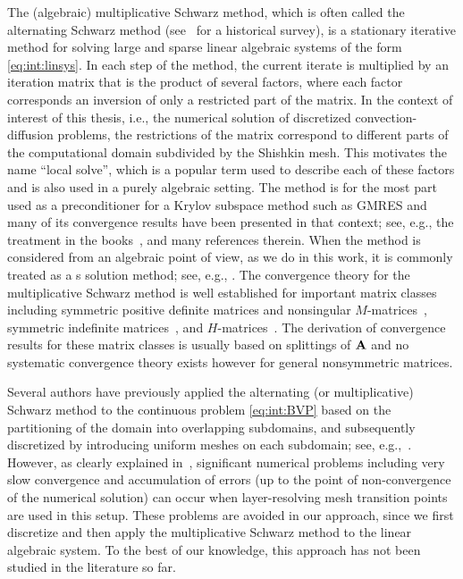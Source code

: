 \medskip

The (algebraic) multiplicative Schwarz method, which is often
called the alternating Schwarz method (see~\cite{Gan08} for a historical
survey), is a stationary iterative method for solving large
and sparse linear algebraic systems of the form \eqref{eq:int:linsys}. In each
step of the method, the current iterate is multiplied by
an iteration matrix that is the  product of several factors, where each factor
corresponds an inversion of only  a restricted part of the matrix. In the
context of interest of this thesis, i.e., the numerical solution of discretized
convection-diffusion problems, the restrictions of the matrix correspond to
different parts of the computational domain subdivided by the Shishkin
mesh. This motivates the name ``local solve'', which is a popular term used to
describe each of these factors and is also used in a purely algebraic setting.
The method is for the most part used as a preconditioner for a Krylov subspace
method such as GMRES and many of its convergence results have been presented in
that context; see, e.g., the treatment in the books~\cite{DolJolNat15, TosWid05}, and many references therein. When the method is considered from an
algebraic point of view, as we do in this work, it is commonly treated as a s
solution method; see, e.g., \cite{BenFroNabSzy01}. The convergence theory for
the multiplicative Schwarz method is well established for important matrix
classes including symmetric positive definite matrices and nonsingular
$M$-matrices~\cite{BenFroNabSzy01}, symmetric indefinite
matrices~\cite{FroNabSzy08,FroSzy14}, and $H$-matrices~\cite{BruPedSzy04}. The
derivation of convergence results for these matrix classes is usually based on
splittings of $\mathbf{A}$ and no systematic convergence theory exists however for
general nonsymmetric matrices.

Several authors have previously applied the alternating (or multiplicative)
Schwarz method to the continuous problem \eqref{eq:int:BVP} based on the
partitioning of the domain into overlapping subdomains, and subsequently
discretized by introducing uniform meshes on each subdomain; see,
e.g.,~\cite{FarHegMilOriShi00, FarShi00, MacMilOriShi00, MacMilOriShi01,MacOriShi00, MacOriShi02,MilOriShi96}.
However, as clearly explained in~\cite{MacOriShi02}, significant numerical
problems including very slow convergence and accumulation of errors (up to the
point of non-convergence of the numerical solution) can occur when
layer-resolving mesh transition points are used in this setup. These problems
are avoided in our approach, since we first discretize and then apply
the multiplicative Schwarz method to the linear algebraic system. To the best
of our knowledge, this approach has not been studied in the literature so far.

